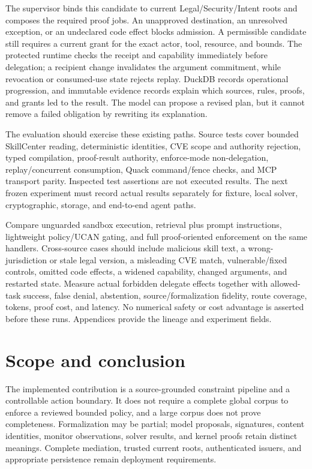 \documentclass{article}
\begin{document}
The supervisor binds this candidate to current Legal/Security/Intent roots and composes the required proof jobs. An unapproved destination, an unresolved exception, or an undeclared code effect blocks admission. A permissible candidate still requires a current grant for the exact actor, tool, resource, and bounds. The protected runtime checks the receipt and capability immediately before delegation; a recipient change invalidates the argument commitment, while revocation or consumed-use state rejects replay. DuckDB records operational progression, and immutable evidence records explain which sources, rules, proofs, and grants led to the result. The model can propose a revised plan, but it cannot remove a failed obligation by rewriting its explanation.

The evaluation should exercise these existing paths. Source tests cover bounded SkillCenter reading, deterministic identities, CVE scope and authority rejection, typed compilation, proof-result authority, enforce-mode non-delegation, replay/concurrent consumption, Quack command/fence checks, and MCP transport parity. Inspected test assertions are not executed results. The next frozen experiment must record actual results separately for fixture, local solver, cryptographic, storage, and end-to-end agent paths.

Compare unguarded sandbox execution, retrieval plus prompt instructions, lightweight policy/UCAN gating, and full proof-oriented enforcement on the same handlers. Cross-source cases should include malicious skill text, a wrong-jurisdiction or stale legal version, a misleading CVE match, vulnerable/fixed controls, omitted code effects, a widened capability, changed arguments, and restarted state. Measure actual forbidden delegate effects together with allowed-task success, false denial, abstention, source/formalization fidelity, route coverage, tokens, proof cost, and latency. No numerical safety or cost advantage is asserted before these runs. Appendices provide the lineage and experiment fields.

\section{Scope and conclusion}

The implemented contribution is a source-grounded constraint pipeline and a controllable action boundary. It does not require a complete global corpus to enforce a reviewed bounded policy, and a large corpus does not prove completeness. Formalization may be partial; model proposals, signatures, content identities, monitor observations, solver results, and kernel proofs retain distinct meanings. Complete mediation, trusted current roots, authenticated issuers, and appropriate persistence remain deployment requirements.
\end{document}
